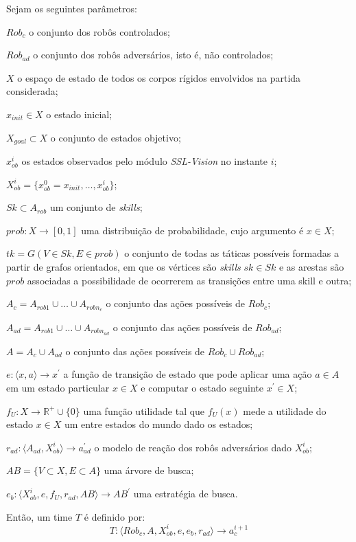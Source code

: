 \begin{defi}[Time]\label{def:time}
  Sejam os seguintes parâmetros:

  \begin{description}
    \item $Rob_c$ o conjunto dos robôs controlados;
    \item $Rob_{ad}$ o conjunto dos robôs adversários, isto é, não controlados;
    \item $X$ o espaço de estado de todos os corpos rígidos envolvidos na partida considerada;
    \item $x_{init} \in X$ o estado inicial;
    \item $X_{goal}\subset X$ o conjunto de estados objetivo;
    \item $x_{ob}^{i}$ os estados observados pelo módulo \textit{SSL-Vision} no instante $i$;
    \item $X_{ob}^{i} =  \lbrace{x_{ob}^{0} = x_{init},\dots,x_{ob}^{i}}\rbrace$;
    \item $Sk \subset A_{rob}$ um conjunto de \textit{skills};
    \item $prob: X \longrightarrow [0,1]$ uma distribuição de probabilidade, cujo argumento é
          $x \in X$;
    \item $tk = G(V \in Sk, E \in {prob} )$ o conjunto de todas as táticas possíveis
          formadas a partir de grafos orientados, em que os vértices são \textit{skills} $sk \in Sk$
          e as arestas são $prob$ associadas a possibilidade de ocorrerem as transições
          entre uma skill e outra;
    \item $A_c = A_{rob 1} \cup \dots \cup A_{rob n_c}$ o conjunto das ações possíveis de $Rob_c$;
    \item $A_{ad} = A_{rob 1} \cup \dots \cup A_{rob n_{ad}}$ o conjunto das ações possíveis de $Rob_{ad}$;
    \item $A = A_c \cup A_{ad}$ o conjunto das ações possíveis de $Rob_c \cup Rob_{ad}$;
    \item $e: \langle x,a \rangle \longrightarrow x^{'}$ a função de transição de estado que pode
          aplicar uma ação $a\in A$ em um estado particular
          $x \in X$ e computar o estado seguinte $x^{'} \in X$;
    \item $f_{U}: X \longrightarrow \mathbb{R^{+}} \cup\lbrace 0\rbrace$ uma função utilidade tal que
          $f_{U}(x)$ mede a utilidade do estado $x \in X$ um entre estados do mundo dado os estados;
    \item $r_{ad}: \langle A_{ad}, X_{ob}^{i}\rangle \longrightarrow a_{ad}^{'}$ o modelo de reação dos robôs
          adversários dado $X_{ob}^{i}$;
    \item $AB =\lbrace V \subset X, E \subset A\rbrace$ uma árvore de busca;
    \item $e_b: \langle X_{ob}^{i}, e, f_{U}, r_{ad}, AB\rangle \longrightarrow AB^{'}$ uma estratégia de busca.
  \end{description}

  Então, um time $T$ é definido por:
  \[
    T: \langle Rob_c, A, X_{ob}^{i}, e, e_b, r_{ad} \rangle \longrightarrow a_c^{i+1}
  \]
\end{defi}

